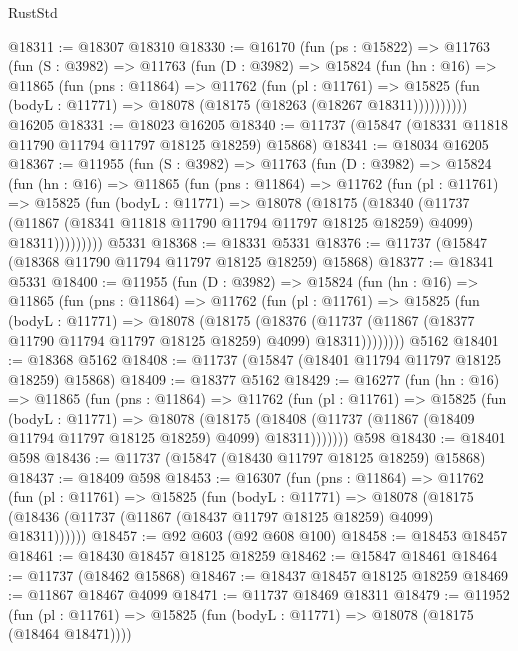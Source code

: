 \begin{lexlean}{RustStd}
\begin{coremodule}
@18311 := @18307 @18310
@18330 := @16170
    (fun (ps : @15822) =>
    @11763
      (fun (S : @3982) =>
      @11763
        (fun (D : @3982) =>
        @15824
          (fun (hn : @16) =>
          @11865
            (fun (pns : @11864) =>
            @11762
              (fun (pl : @11761) =>
              @15825 (fun (bodyL : @11771) => @18078 (@18175 (@18263 (@18267 @18311))))))))))
    @16205
@18331 := @18023 @16205
@18340 := @11737 (@15847 (@18331 @11818 @11790 @11794 @11797 @18125 @18259) @15868)
@18341 := @18034 @16205
@18367 := @11955
    (fun (S : @3982) =>
    @11763
      (fun (D : @3982) =>
      @15824
        (fun (hn : @16) =>
        @11865
          (fun (pns : @11864) =>
          @11762
            (fun (pl : @11761) =>
            @15825
              (fun (bodyL : @11771) =>
              @18078
                (@18175
                  (@18340
                    (@11737
                      (@11867 (@18341 @11818 @11790 @11794 @11797 @18125 @18259) @4099)
                      @18311)))))))))
    @5331
@18368 := @18331 @5331
@18376 := @11737 (@15847 (@18368 @11790 @11794 @11797 @18125 @18259) @15868)
@18377 := @18341 @5331
@18400 := @11955
    (fun (D : @3982) =>
    @15824
      (fun (hn : @16) =>
      @11865
        (fun (pns : @11864) =>
        @11762
          (fun (pl : @11761) =>
          @15825
            (fun (bodyL : @11771) =>
            @18078
              (@18175
                (@18376
                  (@11737 (@11867 (@18377 @11790 @11794 @11797 @18125 @18259) @4099) @18311))))))))
    @5162
@18401 := @18368 @5162
@18408 := @11737 (@15847 (@18401 @11794 @11797 @18125 @18259) @15868)
@18409 := @18377 @5162
@18429 := @16277
    (fun (hn : @16) =>
    @11865
      (fun (pns : @11864) =>
      @11762
        (fun (pl : @11761) =>
        @15825
          (fun (bodyL : @11771) =>
          @18078
            (@18175
              (@18408 (@11737 (@11867 (@18409 @11794 @11797 @18125 @18259) @4099) @18311)))))))
    @598
@18430 := @18401 @598
@18436 := @11737 (@15847 (@18430 @11797 @18125 @18259) @15868)
@18437 := @18409 @598
@18453 := @16307
    (fun (pns : @11864) =>
    @11762
      (fun (pl : @11761) =>
      @15825
        (fun (bodyL : @11771) =>
        @18078 (@18175 (@18436 (@11737 (@11867 (@18437 @11797 @18125 @18259) @4099) @18311))))))
@18457 := @92 @603 (@92 @608 @100)
@18458 := @18453 @18457
@18461 := @18430 @18457 @18125 @18259
@18462 := @15847 @18461
@18464 := @11737 (@18462 @15868)
@18467 := @18437 @18457 @18125 @18259
@18469 := @11867 @18467 @4099
@18471 := @11737 @18469 @18311
@18479 := @11952
    (fun (pl : @11761) => @15825 (fun (bodyL : @11771) => @18078 (@18175 (@18464 @18471))))

\end{coremodule}
\end{lexlean}
